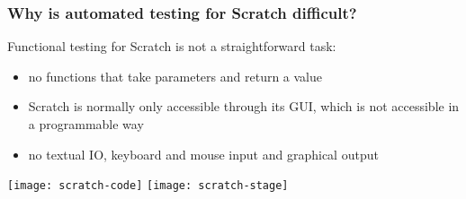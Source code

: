\begin{frame}
\end{frame}

\begin{frame}\frametitle{Why is automated testing for Scratch difficult?}
    Functional testing for Scratch is not a straightforward task:
    \begin{itemize}
        \item \textcolor{upfim}{no functions} that take parameters and return a value
        \item Scratch is normally only accessible through its GUI, which is not accessible in a programmable way
        \item \textcolor{upfim}{no textual IO}, keyboard and mouse input and graphical output
    \end{itemize}

    \bigskip

    \centering
    \texttt{[image: scratch-code]}
    \hspace{1em}
    \texttt{[image: scratch-stage]}
\end{frame}

\begin{frame}
\end{frame}

